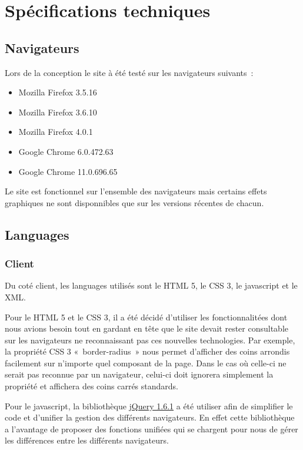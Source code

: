 \documentclass[letter, 10pt]{report}
\begin{document}
\section{Spécifications techniques}


\subsection{Navigateurs}
Lors de la conception le site à été testé sur les navigateurs suivants~:

\begin{itemize}
\item Mozilla Firefox 3.5.16
\item Mozilla Firefox 3.6.10
\item Mozilla Firefox 4.0.1
\item Google Chrome 6.0.472.63
\item Google Chrome 11.0.696.65
\end{itemize}

Le site est fonctionnel sur l'ensemble des navigateurs mais certains effets graphiques ne sont disponnibles que sur les versions récentes de chacun.

\subsection{Languages}
\subsubsection{Client}
Du coté client, les languages utilisés sont le HTML 5, le CSS 3, le javascript et le XML.

Pour le HTML 5 et le CSS 3, il a été décidé d'utiliser les fonctionnalitées dont nous avions besoin tout en gardant en tête que le site devait rester consultable sur les navigateurs ne reconnaissant pas ces nouvelles technologies. Par exemple, la propriété CSS 3 «~border-radius~» nous permet d'afficher des coins arrondis facilement sur n'importe quel composant de la page. Dans le cas où celle-ci ne serait pas reconnue par un navigateur, celui-ci doit ignorera simplement la propriété et affichera des coins carrés standards.

Pour le javascript, la bibliothèque \href{http://jquery.com/}{jQuery 1.6.1} a été utiliser afin de simplifier le code et d'unifier la gestion des différents navigateurs. En effet cette bibliothèque a l'avantage de proposer des fonctions unifiées qui se chargent pour nous de gérer les différences entre les différents navigateurs.
\end{document}
